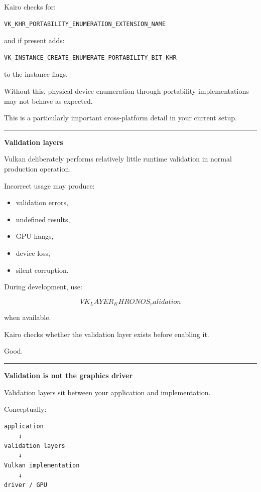 Kairo checks for:

\begin{verbatim}
VK_KHR_PORTABILITY_ENUMERATION_EXTENSION_NAME
\end{verbatim}

and if present adds:

\begin{verbatim}
VK_INSTANCE_CREATE_ENUMERATE_PORTABILITY_BIT_KHR
\end{verbatim}

to the instance flags.

Without this, physical-device enumeration through portability implementations may not behave as expected.

This is a particularly important cross-platform detail in your current setup.

\begin{center}\rule{0.5\linewidth}{0.5pt}\end{center}

\textbf{Validation layers}

Vulkan deliberately performs relatively little runtime validation in normal production operation.

Incorrect usage may produce:

\begin{itemize}
\tightlist
\item
  validation errors,
\item
  undefined results,
\item
  GPU hangs,
\item
  device loss,
\item
  silent corruption.
\end{itemize}

During development, use:

\[
\boxed{
VK_LAYER_KHRONOS_validation
}
\]

when available.

Kairo checks whether the validation layer exists before enabling it.

Good.

\begin{center}\rule{0.5\linewidth}{0.5pt}\end{center}

\textbf{Validation is not the graphics driver}

Validation layers sit between your application and implementation.

Conceptually:

\begin{verbatim}
application
    ↓
validation layers
    ↓
Vulkan implementation
    ↓
driver / GPU
\end{verbatim}

